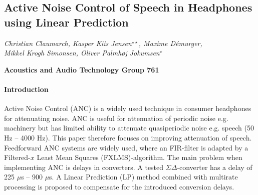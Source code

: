 \documentclass[a4paper]{article}
\title{}
\begin{document}
	
	{\centering
		\subsection*{Active Noise Control of Speech in Headphones using Linear Prediction}}
	
	{\centering
		\textit{Christian Claumarch, Kasper Kiis Jensen$^{\star \star}$, Maxime Démurger, \\Mikkel Krogh Simonsen, Oliver Palmhøj Jokumsen$^{\star}$}
		\par}
	{\centering
		\textbf{Acoustics and Audio Technology Group 761}
		\par}
	
	\bigskip
	
	\paragraph{Introduction} 

	Active Noise Control (ANC) is a widely used technique in consumer headphones for attenuating noise. ANC is useful for attenuation of periodic noise e.g. machinery but has limited ability to attenuate quasiperiodic noise e.g. speech (50 Hz -- 4000 Hz). This paper therefore focuses on improving attenuation of speech. Feedforward ANC systems are widely used, where an FIR-filter is adapted by a Filtered-$x$ Least Mean Squares (FXLMS)-algorithm. The main problem when implementing ANC is delays in converters. A tested $\Sigma\Delta$-converter has a delay of 225 $\mu$s -- 900 $\mu$s. A Linear Prediction (LP) method combined with multirate processing is proposed to compensate for the introduced conversion delays.
\end{document}
